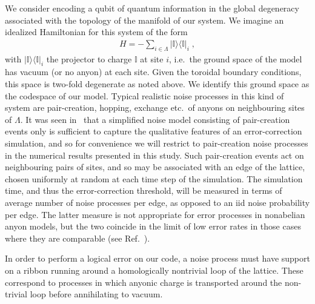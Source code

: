 \documentclass[aps, prl, letterpaper, twocolumn, superscriptaddress, notitlepage, 10pt]{revtex4-1}
\newcommand{\ket}[1]{|{#1}\rangle}
\newcommand{\bra}[1]{\langle{#1}|}
\newcommand{\ketbra}[2]{\ket{#1}\!\bra{#2}}
\newcommand{\proj}[1]{\ketbra{#1}{#1}}
\begin{document}
We consider encoding a qubit of quantum information in the global degeneracy associated 
with the topology of the manifold of our system. We imagine an idealized Hamiltonian for this 
system of the form
\begin{align}
	H=-\sum_{i\in \Lambda}\proj{\mathbb{I}}_i\;,\label{e:hamiltonian}
\end{align}
with $\proj{\mathbb{I}}_i$ the projector to charge $\mathbb{I}$ at site $i$, i.e.~the ground 
space of the model has vacuum (or no anyon) at each site. Given the toroidal boundary 
conditions, this space is two-fold degenerate as noted above. We identify this ground space 
as the codespace of our model. Typical realistic noise processes in this kind of system are 
pair-creation, hopping, exchange etc.~of anyons on neighbouring sites of $\Lambda$. It was 
seen in~\cite{Brell2013} that a simplified noise model consisting of pair-creation events only 
is sufficient to capture the qualitative features of an error-correction simulation, and so for convenience we 
will restrict to pair-creation noise processes in the numerical results presented in this study. Such pair-creation events act 
on neighbouring pairs of sites, and so may be associated with an edge of the lattice, chosen 
uniformly at random at each time step of the simulation. The simulation time, and thus the 
error-correction threshold, will be measured in terms of average number of noise processes 
per edge, as opposed to an iid noise probability per edge. The latter measure is not 
appropriate for error processes in nonabelian anyon models, but the two coincide in the limit 
of low error rates in those cases where they are comparable (see Ref.~\cite{Brell2013}).

In order to perform a logical error on our code, a noise process must have support on a 
ribbon running around a homologically nontrivial loop of the lattice. These correspond to 
processes in which anyonic charge is transported around the non-trivial loop before 
annihilating to vacuum.
\end{document}
